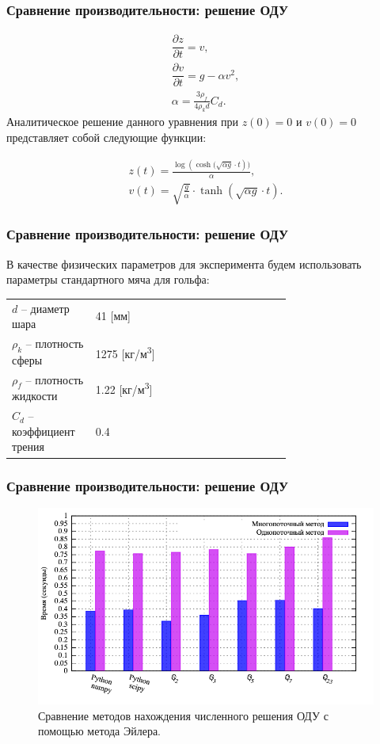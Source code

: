 \documentclass[10pt,professionalfont,utf8,presentation,compress]{beamer}
\theoremstyle{definition}
\theoremstyle{plain}
\begin{document}
\begin{frame}
\frametitle{Сравнение производительности: решение ОДУ}
\begin{equation}
\begin{aligned}
\dfrac{\partial z}{ \partial t} = v, \\
\dfrac{\partial v}{ \partial t} = g - \alpha v^2, \\
\alpha = \frac{3\rho_f}{4\rho_k d}C_d.
\end{aligned}
\end{equation}
\noindent Аналитическое решение данного уравнения при $z(0)=0$ и $v(0)=0$ представляет собой следующие функции:

\begin{equation}
\begin{aligned}
z(t)=\frac{\log{(\cosh{(\sqrt{\alpha g} \cdot t})})}{\alpha}, \\
v(t)=\sqrt{\frac{g}{\alpha}} \cdot \tanh{(\sqrt{\alpha g} \cdot t)}.
\end{aligned}
\end{equation}
\end{frame}


\begin{frame}
\frametitle{Сравнение производительности: решение ОДУ}
В качестве физических параметров для эксперимента будем использовать параметры стандартного мяча для гольфа:
\begin{threeparttable}
\begin{longtable}[H]{lp{0.7\linewidth}}
{$d$} -- диаметр шара & 41 [мм] \\
{$\rho_k$} -- плотность сферы & 1275 [кг/м\textsuperscript{3}] \\
{$\rho_f$} -- плотность жидкости & 1.22 [кг/м\textsuperscript{3}] \\
{$C_d$} -- коэффициент трения & 0.4
\end{longtable}
\end{threeparttable}
\end{frame}


\begin{frame}
\frametitle{Сравнение производительности: решение ОДУ}
\begin{figure}[H]
\centerline{\includegraphics[width=0.95\linewidth]{../gnuplot/multi/euler/plot.png}}
\caption{Сравнение методов нахождения численного решения ОДУ с помощью метода Эйлера.}
\label{img:multi:ode:euler}
\end{figure}
\end{frame}
\end{document}
